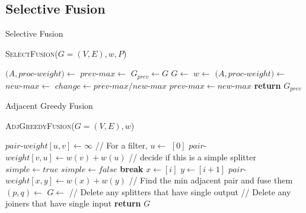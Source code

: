\subsection{Selective Fusion}
\begin{algorithm}
\caption{Selective Fusion} \label {alg:select_fus}
\textsc{SelectFusion}($G = (V, E), w, P$)
\begin{algorithmic}[1]
\State $(A, proc$-$weight) \gets $  
\State $prev$-$max \gets $ 
\Repeat
	\State $G_{prev} \gets G$
	\State $G \gets $ 
	\State $w \gets $ 
	\State $(A, proc$-$weight) \gets $ 
	\State $new$-$max \gets $ 
	\State $change \gets prev$-$max / new$-$max $
	\State $prev$-$max \gets new$-$max$
\State \textbf{return} $G_{prev}$
\end{algorithmic}
\end{algorithm}



\begin{algorithm}
\caption{Adjacent Greedy Fusion} \label {alg:adj_fus}
\textsc{AdjGreedyFusion}($G = (V, E), w$)
\begin{algorithmic}[1]
		\State $pair$-$weight[u,v] \gets \infty$
	\EndFor
\EndFor
{}
\Statex // For a filter, 
		\State $u \gets $ $[0]$
		\State $pair$-$weight[v,u] \gets w(v) + w(u)$
		\Statex // decide if this is a simple splitter
		\State $simple \gets true$			
				\State $simple \gets false$
				\State \textbf{break}
			\EndIf
		\EndFor
				\State $x \gets $$[i]$
				\State $y \gets $$[i + 1]$
				\State $pair$-$weight[x,y] \gets w(x) + w(y)$
			\EndFor 
		\EndIf
	\EndIf
\EndFor
\Statex // Find the min adjacent pair and fuse them
\State $(p, q) \gets $ 
\State $G \gets $ 
\Statex // Delete any splitters that have single output
\State {}
\Statex // Delete any joiners that have single input
\State {}
\State \textbf{return} $G$
\end{algorithmic}
\end{algorithm}

